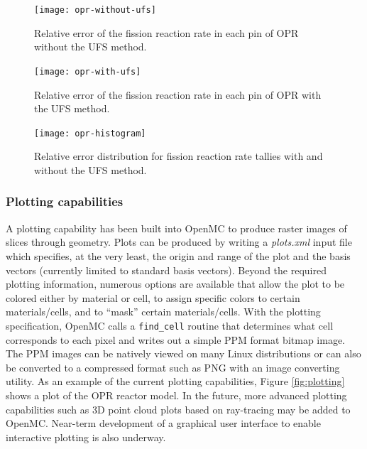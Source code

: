 \documentclass{ansconf}
\begin{document}
\begin{figure}[!htb]
  \begin{minipage}{0.45\textwidth}
    \centering
    \texttt{[image: opr-without-ufs]}
    \caption{Relative error of the fission reaction rate in each pin of OPR
      without the UFS method.}
    \label{fig:without-ufs}
  \end{minipage}
  \hspace{0.1\textwidth}
  \begin{minipage}{0.45\textwidth}
    \centering
    \texttt{[image: opr-with-ufs]}
    \caption{Relative error of the fission reaction rate in each pin of OPR with
      the UFS method.}
    \label{fig:with-ufs}
  \end{minipage}
\end{figure}

\begin{figure}[!htb]
  \centering
  \texttt{[image: opr-histogram]}
  \caption{Relative error distribution for fission reaction rate tallies with
    and without the UFS method.}
  \label{fig:histogram}
\end{figure}

\subsubsection{Plotting capabilities}

A plotting capability has been built into OpenMC to produce raster images of
slices through geometry. Plots can be produced by writing a \emph{plots.xml}
input file which specifies, at the very least, the origin and range of the plot
and the basis vectors (currently limited to standard basis vectors). Beyond the
required plotting information, numerous options are available that allow the
plot to be colored either by material or cell, to assign specific colors to
certain materials/cells, and to ``mask'' certain materials/cells. With the
plotting specification, OpenMC calls a \texttt{find\_cell} routine that
determines what cell corresponds to each pixel and writes out a simple PPM
format bitmap image. The PPM images can be natively viewed on many Linux
distributions or can also be converted to a compressed format such as PNG with
an image converting utility. As an example of the current plotting capabilities,
Figure \ref{fig:plotting} shows a plot of the OPR reactor model. In the future, more advanced plotting capabilities such as 3D point cloud plots
based on ray-tracing may be added to OpenMC. Near-term development of a
graphical user interface to enable interactive plotting is also underway.
\end{document}
